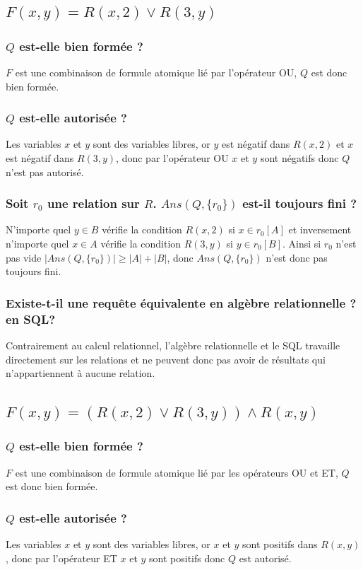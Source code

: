 \documentclass[10pt,a4paper,twoside]{article}
\begin{document}
\subsection{$F(x,y) = R(x,2) \vee R(3,y)$}
\subsubsection{$Q$ est-elle bien formée ?}
$F$ est une combinaison de formule atomique lié par l'opérateur OU, $Q$ est donc bien formée.

\subsubsection{$Q$ est-elle autorisée ?}
Les variables $x$ et $y$ sont des variables libres, or $y$ est négatif dans $R(x,2)$ et $x$ est négatif dans $R(3,y)$, donc par l'opérateur OU $x$ et $y$ sont négatifs donc $Q$ n'est pas autorisé.

\subsubsection{Soit $r_{0}$ une relation sur $R$. $Ans(Q,\{r_{0}\})$ est-il toujours fini ?}
N'importe quel $y \in B$ vérifie la condition $R(x,2)$ si $x \in r_{0}[A]$ et inversement n'importe quel $x \in A$ vérifie la condition $R(3,y)$ si $y \in r_{0}[B]$. Ainsi si $r_{0}$ n'est pas vide $|Ans(Q,\{r_{0}\})| \geq |A|+|B|$, donc $Ans(Q,\{r_{0}\})$ n'est donc pas toujours fini.
\subsubsection{Existe-t-il une requête équivalente en algèbre relationnelle ? en SQL?}
Contrairement au calcul relationnel, l'algèbre relationnelle et le SQL travaille directement sur les relations et ne peuvent donc pas avoir de résultats qui n'appartiennent à aucune relation.

\subsection{$F(x,y) = (R(x,2) \vee R(3,y)) \wedge R(x,y)$}
\subsubsection{$Q$ est-elle bien formée ?}
$F$ est une combinaison de formule atomique lié par les opérateurs OU et ET, $Q$ est donc bien formée.

\subsubsection{$Q$ est-elle autorisée ?}
Les variables $x$ et $y$ sont des variables libres, or $x$ et $y$ sont positifs dans $R(x,y)$, donc par l'opérateur ET $x$ et $y$ sont positifs donc $Q$ est autorisé.
\end{document}
